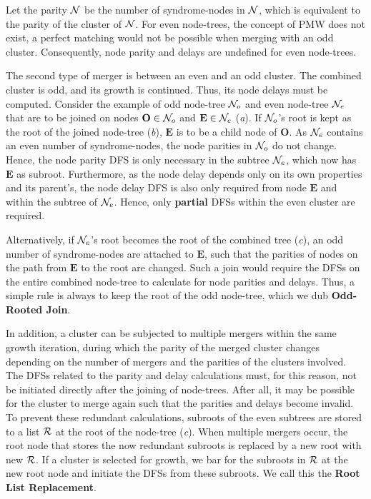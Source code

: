 Let the parity $\mathcal{N}$ be the number of syndrome-nodes in $\mathcal{N}$, which is equivalent to the parity of the cluster of $\mathcal{N}$. For even node-trees, the concept of PMW does not exist, a perfect matching would not be possible when merging with an odd cluster. Consequently, node parity and delays are undefined for even node-trees. 

The second type of merger is between an even and an odd cluster. The combined cluster is odd, and its growth is continued. Thus, its node delays must be computed. Consider the example of odd node-tree $\mathcal{N}_o$ and even node-tree $\mathcal{N}_e$ that are to be joined on nodes $\mathbf{O}\in \mathcal{N}_o$ and $\mathbf{E} \in \mathcal{N}_e$ (\emph{a}). If $\mathcal{N}_o$'s root is kept as the root of the joined node-tree (\emph{b}), $\mathbf{E}$ is to be a child node of $\mathbf{O}$. As $\mathcal{N}_e$ contains an even number of syndrome-nodes, the node parities in $\mathcal{N}_o$ do not change. Hence, the node parity DFS is only necessary in the subtree $\mathcal{N}_e$, which now has $\mathbf{E}$ as subroot. Furthermore, as the node delay depends only on its own properties and its parent's, the node delay DFS is also only required from node $\mathbf{E}$ and within the subtree of $\mathcal{N}_e$. Hence, only \textbf{partial} DFSs within the even cluster are required. %

Alternatively, if $\mathcal{N}_e$'s root becomes the root of the combined tree (\emph{c}), an odd number of syndrome-nodes are attached to $\mathbf{E}$, such that the parities of nodes on the path from $\mathbf{E}$ to the root are changed. Such a join would require the DFSs on the entire combined node-tree to calculate for node parities and delays. Thus, a simple rule is always to keep the root of the odd node-tree, which we dub \textbf{Odd-Rooted Join}.


In addition, a cluster can be subjected to multiple mergers within the same growth iteration, during which the parity of the merged cluster changes depending on the number of mergers and the parities of the clusters involved. The DFSs related to the parity and delay calculations must, for this reason, not be initiated directly after the joining of node-trees. After all, it may be possible for the cluster to merge again such that the parities and delays become invalid. To prevent these redundant calculations, subroots of the even subtrees are stored to a list $\mathcal{R}$ at the root of the node-tree (\emph{c}). When multiple mergers occur, the root node that stores the now redundant subroots is replaced by a new root with new $\mathcal{R}$. If a cluster is selected for growth, we bar for the subroots in $\mathcal{R}$ at the new root node and initiate the DFSs from these subroots. We call this the \textbf{Root List Replacement}. 


